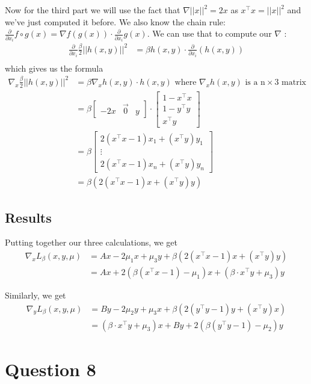\documentclass{article}
\newcommand{\tp}{^\top}
\newcommand{\p}{\frac{\partial}{\partial x_i}}
\begin{document}
Now for the third part we will use the fact that $\nabla||x||^2=2x$ as $x\tp x=||x||^2$ and we've just computed it before. We also know the chain rule: $\p f\circ g(x)= \nabla f (g(x)) \cdot \p g(x)$. We can use that to compute our $\nabla$ :
\begin{align*}
\p \frac{\beta}{2} ||h(x,y)||^2&=\beta h(x,y) \cdot \p(h(x,y))\\
\end{align*}
which gives us the formula
\begin{align*}
\nabla_x \frac{\beta}{2} ||h(x,y)||^2&=\beta \nabla_x h(x,y) \cdot  h(x,y) \text{ where } \nabla_x h(x,y) \text{ is a n} \times \text{3 matrix}\\
&=\beta\begin{bmatrix} -2x & \vec 0 & y \end{bmatrix}   \cdot \begin{bmatrix} 1-x\tp x \\ 1-y\tp y\\ x\tp y \end{bmatrix} \\
&=\beta\begin{bmatrix}2(x\tp x-1) x_1+(x\tp y )y_1\\ \vdots \\ 2(x\tp x-1) x_n+(x\tp y )y_n \end{bmatrix}\\
&=\beta \left( 2(x\tp x-1)  x+(x\tp y ) y \right) 
\end{align*}


\subsection*{Results}
Putting together our three calculations, we get
\begin{align*}
\nabla_x L_\beta(x,y,\mu)&=Ax - 2\mu_1 x+\mu_3 y+\beta \left( 2(x\tp x-1) x+(x\tp y ) y \right) \\
&=Ax+ 2(\beta (x\tp x-1) - \mu_1) x +(\beta \cdot x\tp y + \mu_3)y
\end{align*}

Similarly, we get
\begin{align*}
\nabla_y L_\beta(x,y,\mu)&=By - 2\mu_2 y+\mu_3 x+\beta \left( 2(y\tp y-1)  y+(x\tp y ) x \right) \\
&=(\beta \cdot x\tp y + \mu_3)x+ By + 2(\beta (y\tp y-1) - \mu_2) y
\end{align*}


\section*{Question 8}
\end{document}
